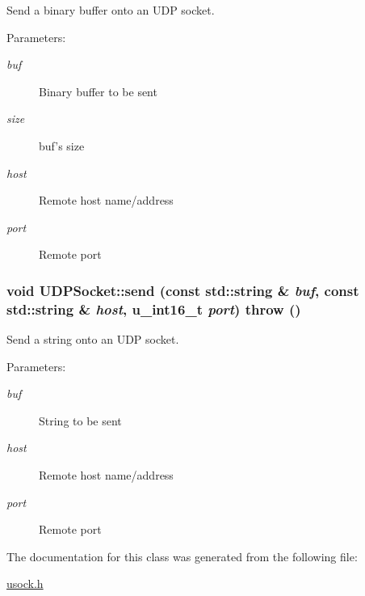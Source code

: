 Send a binary buffer onto an UDP socket. 

\begin{Desc}
\item[Parameters:]
\begin{description}
\item[{\em buf}]Binary buffer to be sent \item[{\em size}]buf's size \item[{\em host}]Remote host name/address \item[{\em port}]Remote port \end{description}
\end{Desc}
\hypertarget{classUDPSocket_28db3dc93452723bdfd861442268b87c}{
\subsubsection[{send}]{\setlength{\rightskip}{0pt plus 5cm}void UDPSocket::send (const std::string \& {\em buf}, \/  const std::string \& {\em host}, \/  u\_\-int16\_\-t {\em port})  throw ()}}
\label{classUDPSocket_28db3dc93452723bdfd861442268b87c}


Send a string onto an UDP socket. 

\begin{Desc}
\item[Parameters:]
\begin{description}
\item[{\em buf}]String to be sent \item[{\em host}]Remote host name/address \item[{\em port}]Remote port \end{description}
\end{Desc}


The documentation for this class was generated from the following file:\begin{CompactItemize}
\item 
\hyperlink{usock_8h}{usock.h}\end{CompactItemize}

